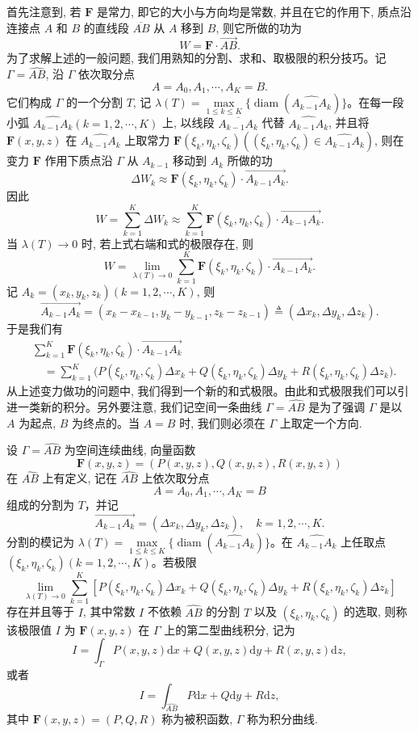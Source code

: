 首先注意到, 若 $\boldsymbol F$ 是常力, 即它的大小与方向均是常数, 并且在它的作用下, 质点沿连接点 $A$ 和 $B$ 的直线段 $\overline{AB}$ 从 $A$ 移到 $B$, 则它所做的功为
\[
  W=\boldsymbol F\cdot\overrightarrow{AB}.
\]
为了求解上述的一般问题, 我们用熟知的分割、求和、取极限的积分技巧。记 $\Gamma=\widehat{AB}$, 沿 $\Gamma$ 依次取分点
\[
  A=A_0,A_1,\cdots,A_K=B.
\]
它们构成 $\Gamma$ 的一个分割 $T$, 记 $\lambda(T)=\max\limits_{1\leqslant k\leqslant K}\{\operatorname{diam}(\widehat{A_{k-1}A_k})\}$。在每一段小弧 $\widehat{A_{k-1}A_k}(k=1,2,\cdots,K)$ 上, 以线段 $\overline{A_{k-1}A_k}$ 代替 $\widehat{A_{k-1}A_k}$, 并且将 $\boldsymbol F(x,y,z)$ 在 $\widehat{A_{k-1}A_k}$ 上取常力 $\boldsymbol F(\xi_k,\eta_k,\zeta_k)((\xi_k,\eta_k,\zeta_k)\in\widehat{A_{k-1}A_k})$, 则在变力 $\boldsymbol F$ 作用下质点沿 $\Gamma$ 从 $A_{k-1}$ 移动到 $A_k$ 所做的功
\[
  \Delta W_k\approx \boldsymbol F(\xi_k,\eta_k,\zeta_k)\cdot\overrightarrow{A_{k-1}A_k}.
\]
因此
\[
  W=\sum_{k=1}^K\Delta W_k
  \approx \sum_{k=1}^K \boldsymbol F(\xi_k,\eta_k,\zeta_k)\cdot\overrightarrow{A_{k-1}A_k}.
\]
当 $\lambda(T)\to0$ 时, 若上式右端和式的极限存在, 则
\[
  W=\lim_{\lambda(T)\to0}\sum_{k=1}^K
  \boldsymbol F(\xi_k,\eta_k,\zeta_k)\cdot\overrightarrow{A_{k-1}A_k}.
\]
记 $A_k=(x_k,y_k,z_k)(k=1,2,\cdots,K)$, 则
\[
  \overrightarrow{A_{k-1}A_k}
  =(x_k-x_{k-1},y_k-y_{k-1},z_k-z_{k-1})
  \triangleq(\Delta x_k,\Delta y_k,\Delta z_k).
\]
于是我们有
\[
\begin{aligned}
  &\sum_{k=1}^K \boldsymbol F(\xi_k,\eta_k,\zeta_k)\cdot\overrightarrow{A_{k-1}A_k}\\
  &\quad=\sum_{k=1}^K\bigl(P(\xi_k,\eta_k,\zeta_k)\Delta x_k
    +Q(\xi_k,\eta_k,\zeta_k)\Delta y_k
    +R(\xi_k,\eta_k,\zeta_k)\Delta z_k\bigr).
\end{aligned}
\]
从上述变力做功的问题中, 我们得到一个新的和式极限。由此和式极限我们可以引进一类新的积分。另外要注意, 我们记空间一条曲线 $\Gamma=\widehat{AB}$ 是为了强调 $\Gamma$ 是以 $A$ 为起点, $B$ 为终点的。当 $A=B$ 时, 我们则必须在 $\Gamma$ 上取定一个方向.

\begin{definition}\label{definition:ma-16-2-1}
设 $\Gamma=\widehat{AB}$ 为空间连续曲线, 向量函数
\[
  \boldsymbol F(x,y,z)=(P(x,y,z),Q(x,y,z),R(x,y,z))
\]
在 $\widehat{AB}$ 上有定义, 记在 $\widehat{AB}$ 上依次取分点
\[
  A=A_0,A_1,\cdots,A_K=B
\]
组成的分割为 $T$，并记
\[\overrightarrow{A_{k-1}A_k}=(\Delta x_k,\Delta y_k,\Delta z_k),\quad k=1,2,\cdots,K.\]
分割的模记为 $\lambda(T)=\max\limits_{1\leqslant k\leqslant K}\{\operatorname{diam}(\widehat{A_{k-1}A_k})\}$。在 $\widehat{A_{k-1}A_k}$ 上任取点 $(\xi_k,\eta_k,\zeta_k)(k=1,2,\cdots,K)$。若极限
\[
  \lim_{\lambda(T)\to0}\sum_{k=1}^K
  [P(\xi_k,\eta_k,\zeta_k)\Delta x_k
  +Q(\xi_k,\eta_k,\zeta_k)\Delta y_k
  +R(\xi_k,\eta_k,\zeta_k)\Delta z_k]
\]
存在并且等于 $I$, 其中常数 $I$ 不依赖 $\widehat{AB}$ 的分割 $T$ 以及 $(\xi_k,\eta_k,\zeta_k)$ 的选取, 则称该极限值 $I$ 为 $\boldsymbol F(x,y,z)$ 在 $\Gamma$ 上的第二型曲线积分, 记为
\[
  I=\int_\Gamma P(x,y,z)\mathrm dx+Q(x,y,z)\mathrm dy+R(x,y,z)\mathrm dz,
\]
或者
\[
  I=\int_{\widehat{AB}}P\mathrm dx+Q\mathrm dy+R\mathrm dz,
\]
其中 $\boldsymbol F(x,y,z)=(P,Q,R)$ 称为被积函数, $\Gamma$ 称为积分曲线.
\end{definition}

